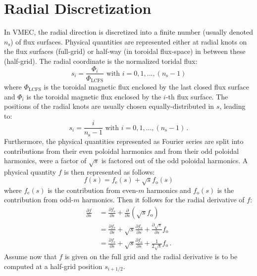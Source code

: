 \FloatBarrier
\section{Radial Discretization} \label{sec:radial_discretization}
In VMEC, the radial direction is discretized into a finite number (usually denoted $n_\mathrm{s}$) of flux surfaces.
Physical quantities are represented either at radial knots on the flux surfaces (full-grid)
or half-way (in toroidal flux-space) in between these (half-grid).
The radial coordinate is the normalized toridal flux:
\begin{equation}
 s_i = \frac{\Phi_i}{\Phi_\mathrm{LCFS}} \textrm{ with } i = 0, 1, ..., (n_\mathrm{s}-1)
\end{equation}
where $\Phi_\mathrm{LCFS}$ is the toroidal magnetic flux enclosed by the last closed flux surface
and $\Phi_i$ is the toroidal magnetic flux enclosed by the $i$-th flux surface.
The positions of the radial knots are usually chosen equally-distributed in $s$, leading to:
\begin{equation}
 s_i = \frac{i}{n_\mathrm{s}-1} \textrm{ with } i = 0, 1, ..., (n_\mathrm{s}-1) \, .
\end{equation}
Furthermore, the physical quantities represented as Fourier series are split
into contributions from their even poloidal harmonics and from their odd poloidal harmonics,
were a factor of $\sqrt{s}$ is factored out of the odd poloidal harmonics.
A physical quantity $f$ is then represented as follows:
\begin{equation}
 f(s) = f_\mathrm{e}(s) + \sqrt{s} f_\mathrm{o}(s)
\end{equation}
where $f_\mathrm{e}(s)$ is the contribution from even-$m$ harmonics
and $f_\mathrm{o}(s)$ is the contribution from odd-$m$ harmonics.
Then it follows for the radial derivative of $f$:
\begin{align}
 \frac{\partial f}{\partial s}
  ~ &= \frac{\partial f_\mathrm{e}}{\partial s} + \frac{\partial}{\partial s} \left( \sqrt{s} f_\mathrm{o} \right) \nonumber \\
  ~ &= \frac{\partial f_\mathrm{e}}{\partial s} + \sqrt{s} \frac{\partial f_\mathrm{o}}{\partial s} + \frac{\partial \sqrt{s}}{\partial s} f_\mathrm{o} \nonumber \\
  ~ &= \frac{\partial f_\mathrm{e}}{\partial s} + \sqrt{s} \frac{\partial f_\mathrm{o}}{\partial s} + \frac{1}{2 \sqrt{s}} f_\mathrm{o} \, .
\end{align}
Assume now that $f$ is given on the full grid
and the radial derivative is to be computed at a half-grid position $s_{i+1/2}$.
